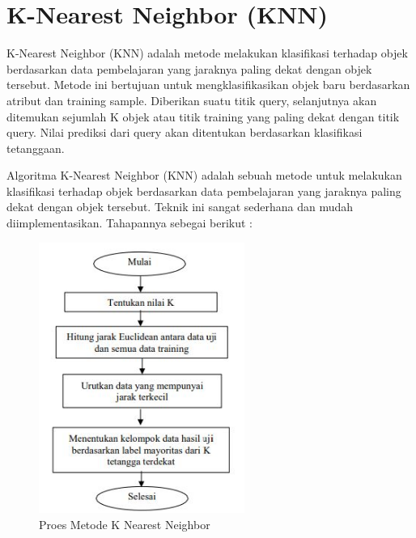 \section{K-Nearest Neighbor (KNN)}
\par K-Nearest Neighbor (KNN) adalah metode melakukan klasifikasi terhadap objek
berdasarkan data pembelajaran yang jaraknya paling dekat dengan objek tersebut. Metode ini bertujuan untuk mengklasifikasikan objek baru berdasarkan atribut dan training sample.
Diberikan suatu titik query, selanjutnya akan ditemukan sejumlah K objek atau titik training yang paling dekat dengan titik query. Nilai prediksi dari query akan ditentukan berdasarkan klasifikasi tetanggaan. \par 
Algoritma K-Nearest Neighbor (KNN) adalah sebuah metode untuk melakukan klasifikasi terhadap objek berdasarkan data pembelajaran yang jaraknya paling dekat dengan objek tersebut. 
Teknik ini sangat sederhana dan mudah diimplementasikan. Tahapannya sebegai berikut :
\newpage
\begin{figure}
    \centering
    \centerline{\includegraphics[width=0.60\textwidth]{chapters/figures/metodeknn.JPG}}
    \caption{Proes Metode K Nearest Neighbor}
    \label{fig:my_label}
\end{figure}

